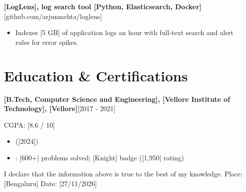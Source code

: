 \documentclass[10pt]{article}
\newcommand{\entry}[2]{\textbf{#1}\hfill #2\par}
\begin{document}
\entry{\textbf{[LogLens]}, log search tool  \textbar{}  [Python, Elasticsearch, Docker]}{[github.com/arjunmehta/loglens]}

\begin{itemize}
  \item Indexes [5 GB] of application logs an hour with full-text search and alert rules for error spikes.
\end{itemize}

\vspace{4pt}

\section{Education \& Certifications}

\entry{\textbf{[B.Tech, Computer Science and Engineering]}, [Vellore Institute of Technology], [Vellore]}{[2017 - 2021]}

CGPA: [8.6 / 10]\par

\vspace{4pt}

\begin{itemize}
  \item [AWS Certified Developer - Associate] ([2024])
  \item [LeetCode]: [600+] problems solved; [Knight] badge ([1,950] rating)
\end{itemize}

\vspace{8pt}

I declare that the information above is true to the best of my knowledge. Place: [Bengaluru]  \textbar{}  Date: [27/11/2026]\par\vspace{4pt}
\end{document}

